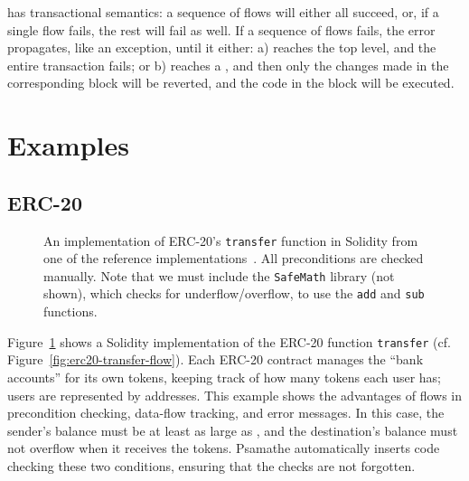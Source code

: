 \documentclass[dvipsnames,runningheads]{llncs}
\begin{document}

\langName has transactional semantics: a sequence of flows will either all succeed, or, if a single flow fails, the rest will fail as well.
If a sequence of flows fails, the error propagates, like an exception, until it either: a) reaches the top level, and the entire transaction fails; or b) reaches a , and then only the changes made in the corresponding  block will be reverted, and the code in the  block will be executed.

\section{Examples}

\subsection{ERC-20}\label{sec:erc20-impl}
\begin{figure}
    \vspace{-2em}
    \centering
    
    \vspace{-1em}
    \caption{An implementation of ERC-20's \lstinline{transfer} function in Solidity from one of the reference implementations~\cite{erc20Consensys}.
        All preconditions are checked manually.
        Note that we must include the \lstinline{SafeMath} library (not shown), which checks for underflow/overflow, to use the \lstinline{add} and \lstinline{sub} functions.}
    \label{fig:erc20-transfer-sol}
    \vspace{-1em}
\end{figure}
Figure~\ref{fig:erc20-transfer-sol} shows a Solidity implementation of the ERC-20 function \lstinline{transfer} (cf. Figure~\ref{fig:erc20-transfer-flow}).
Each ERC-20 contract manages the ``bank accounts'' for its own tokens, keeping track of how many tokens each user has; users are represented by addresses.
This example shows the advantages of flows in precondition checking, data-flow tracking, and error messages.
In this case, the sender's balance must be at least as large as , and the destination's balance must not overflow when it receives the tokens.
Psamathe automatically inserts code checking these two conditions, ensuring that the checks are not forgotten.
\end{document}
